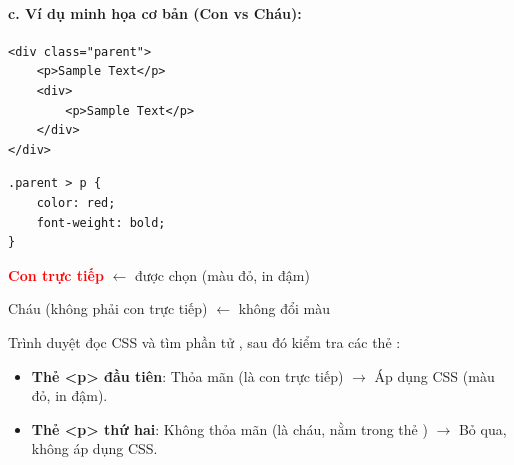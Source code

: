 \paragraph{c. Ví dụ minh họa cơ bản (Con vs Cháu):}
\begin{codeWindow}
\begin{lstlisting}[language=HTML5]
<div class="parent">
    <p>Sample Text</p>
    <div>
        <p>Sample Text</p>
    </div>
</div>
\end{lstlisting}

\begin{lstlisting}[language=CSS3]
.parent > p {
    color: red;
    font-weight: bold;
}
\end{lstlisting}
\end{codeWindow}

\begin{browserWindow}
\sffamily\small
\begin{tcolorbox}[arc=2pt, colback=primaryBlue!5, colframe=primaryBlue!40, boxrule=1pt, title={\sffamily\small\color{white}\textbf{.parent}}, colbacktitle=primaryBlue!70]
\textcolor{red}{\textbf{Con trực tiếp}} {\small\textcolor{gray!60}{$\leftarrow$ được chọn (màu đỏ, in đậm)}} \par\vspace{3pt}
\begin{tcolorbox}[arc=2pt, colback=white, colframe=gray!30, boxrule=1pt, title={\sffamily\scriptsize\color{darkText}div lồng bên trong}]
\textcolor{darkText}{Cháu (không phải con trực tiếp)} {\small\textcolor{gray!60}{$\leftarrow$ không đổi màu}}
\end{tcolorbox}
\end{tcolorbox}
\end{browserWindow}

\begin{noteBox}
Trình duyệt đọc CSS và tìm phần tử , sau đó kiểm tra các thẻ :
\begin{itemize}[leftmargin=1.5em, itemsep=2pt, parsep=0pt]
    \item \textcolor{tipBorder}{\textbf{Thẻ <p> đầu tiên}}: Thỏa mãn (là con trực tiếp) $\rightarrow$ Áp dụng CSS (màu đỏ, in đậm).
    \item \textcolor{warnBorder}{\textbf{Thẻ <p> thứ hai}}: Không thỏa mãn (là cháu, nằm trong thẻ ) $\rightarrow$ Bỏ qua, không áp dụng CSS.
\end{itemize}
\end{noteBox}

